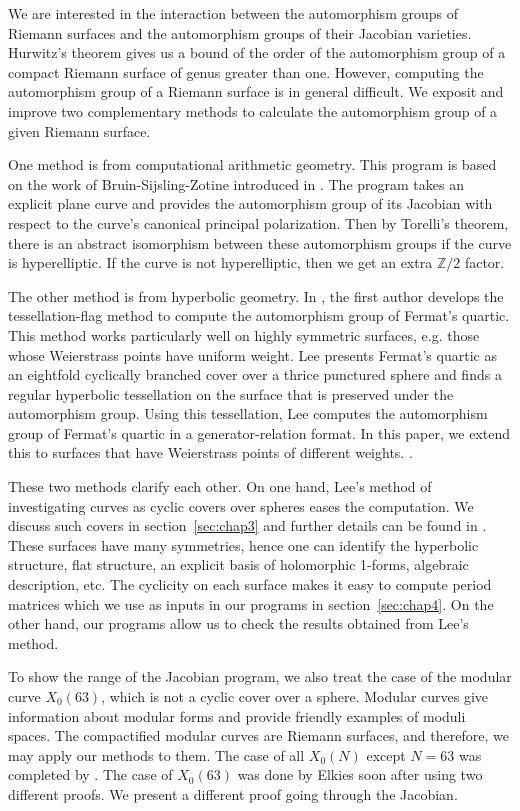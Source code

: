 \documentclass[12pt,reqno]{amsart}
\newcommand{\Z}{\mathbb{Z}}
\theoremstyle{definition}
\theoremstyle{remark}
\begin{document}
We are interested in the interaction between the automorphism groups of Riemann surfaces and the automorphism groups of their Jacobian varieties. Hurwitz's theorem gives us a bound of the order of the automorphism group of a compact Riemann surface of genus greater than one. However, computing the automorphism group of a Riemann surface is in general difficult. We exposit and improve two complementary methods to calculate the automorphism group of a given Riemann surface.

One method is from computational arithmetic geometry. This program is based on the work of Bruin-Sijsling-Zotine introduced in \cite{jeroen}. The program takes an explicit plane curve and provides the automorphism group of its Jacobian with respect to the curve's canonical principal polarization. Then by Torelli's theorem, there is an abstract isomorphism between these automorphism groups if the curve is hyperelliptic. If the curve is not hyperelliptic, then we get an extra $\Z/2$ factor.

The other method is from hyperbolic geometry. In \cite{dami}, the first author develops the tessellation-flag method to compute the automorphism group of Fermat's quartic. This method works particularly well on highly symmetric surfaces, e.g. those whose Weierstrass points have uniform weight. Lee presents Fermat's quartic as an eightfold cyclically branched cover over a thrice punctured sphere and finds a regular hyperbolic tessellation on the surface that is preserved under the automorphism group. Using this tessellation, Lee computes the automorphism group of Fermat's quartic in a generator-relation format. In this paper, we extend this to surfaces that have Weierstrass points of different weights. . 

These two methods clarify each other. On one hand, Lee's method of investigating curves as cyclic covers over spheres eases the computation. We discuss such covers in section~\ref{sec:chap3} and further details can be found in \cite{dthesis}. These surfaces have many symmetries, hence one can identify the hyperbolic structure, flat structure, an explicit basis of holomorphic 1-forms, algebraic description, etc. The cyclicity on each surface makes it easy to compute period matrices which we use as inputs in our programs in section~\ref{sec:chap4}. On the other hand, our programs allow us to check the results obtained from Lee's method. 

To show the range of the Jacobian program, we also treat the case of the modular curve $X_0(63)$, which is not a cyclic cover over a sphere. Modular curves give information about modular forms and provide friendly examples of moduli spaces. The compactified modular curves are Riemann surfaces, and therefore, we may apply our methods to them. The case of all $X_0(N)$ except $N = 63$ was completed by \cite{km}. The case of $X_0(63)$ was done by Elkies soon after using two different proofs. We present a different proof going through the Jacobian.
\end{document}

